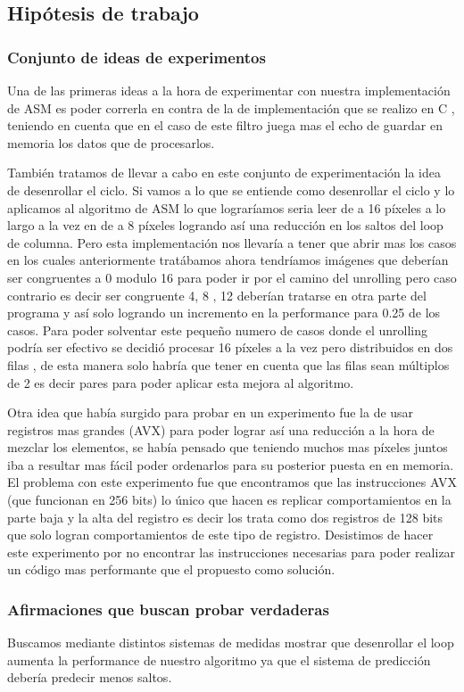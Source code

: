 \subsection{Hipótesis de trabajo}
\subsubsection*{Conjunto de ideas de experimentos}
Una de las primeras ideas a la hora de experimentar con nuestra implementación de ASM es poder correrla en contra de la de implementación que se realizo en C , teniendo en cuenta que en el caso de este filtro juega mas el echo de guardar en memoria los datos que de procesarlos.

También tratamos de llevar a cabo en este conjunto de experimentación la idea de desenrollar el ciclo. Si vamos a lo que se entiende como desenrollar el ciclo y lo aplicamos al algoritmo de ASM lo que lograríamos seria leer de a 16 píxeles a lo largo a la vez en de a 8 píxeles logrando así una reducción en los saltos del loop de columna. Pero esta implementación nos llevaría a tener que abrir mas los casos en los cuales anteriormente tratábamos ahora tendríamos imágenes que deberían ser congruentes a 0 modulo 16 para poder ir por el camino del unrolling pero caso contrario es decir ser congruente 4, 8 , 12 deberían tratarse en otra parte del programa y así solo logrando un incremento en la performance para 0.25 de los casos. Para poder solventar este pequeño numero de casos donde el unrolling podría ser efectivo se decidió procesar 16 píxeles a la vez pero distribuidos en dos filas , de esta manera solo habría que tener en cuenta que las filas sean múltiplos de 2 es decir pares para poder aplicar esta mejora al algoritmo.

Otra idea que había surgido para probar en un experimento fue la de usar registros mas grandes (AVX) para poder lograr así una reducción a la hora de mezclar los elementos, se había pensado que teniendo muchos mas píxeles juntos iba a resultar mas fácil poder ordenarlos para su posterior puesta en en memoria. El problema con este experimento fue que encontramos que las instrucciones AVX (que funcionan en 256 bits) lo único que hacen es replicar comportamientos en la parte baja y la alta del registro es decir los trata como dos registros de 128 bits que solo logran comportamientos de este tipo de registro. Desistimos de hacer este experimento por no encontrar las instrucciones necesarias para poder realizar un código mas performante que el propuesto como solución. 
\subsubsection*{Afirmaciones que buscan probar verdaderas}
Buscamos mediante distintos sistemas de medidas mostrar que desenrollar el loop aumenta la performance de nuestro algoritmo ya que el sistema de predicción debería predecir menos saltos.

